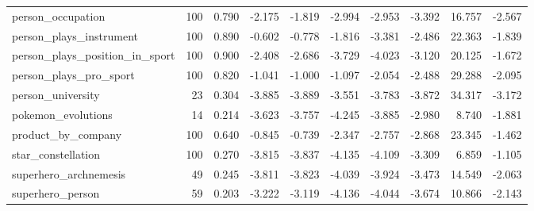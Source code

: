 \begin{table}[htbp]
{\begin{tabular}{lrrrrrrrrr}
person\_occupation & 100 & 0.790 & -2.175 & -1.819 & -2.994 & -2.953 & -3.392 & 16.757 & -2.567 \\
person\_plays\_instrument & 100 & 0.890 & -0.602 & -0.778 & -1.816 & -3.381 & -2.486 & 22.363 & -1.839 \\
person\_plays\_position\_in\_sport & 100 & 0.900 & -2.408 & -2.686 & -3.729 & -4.023 & -3.120 & 20.125 & -1.672 \\
person\_plays\_pro\_sport & 100 & 0.820 & -1.041 & -1.000 & -1.097 & -2.054 & -2.488 & 29.288 & -2.095 \\
person\_university & 23 & 0.304 & -3.885 & -3.889 & -3.551 & -3.783 & -3.872 & 34.317 & -3.172 \\
pokemon\_evolutions & 14 & 0.214 & -3.623 & -3.757 & -4.245 & -3.885 & -2.980 & 8.740 & -1.881 \\
product\_by\_company & 100 & 0.640 & -0.845 & -0.739 & -2.347 & -2.757 & -2.868 & 23.345 & -1.462 \\
star\_constellation & 100 & 0.270 & -3.815 & -3.837 & -4.135 & -4.109 & -3.309 & 6.859 & -1.105 \\
superhero\_archnemesis & 49 & 0.245 & -3.811 & -3.823 & -4.039 & -3.924 & -3.473 & 14.549 & -2.063 \\
superhero\_person & 59 & 0.203 & -3.222 & -3.119 & -4.136 & -4.044 & -3.674 & 10.866 & -2.143 \\
\bottomrule
\end{tabular}}
\end{table}
